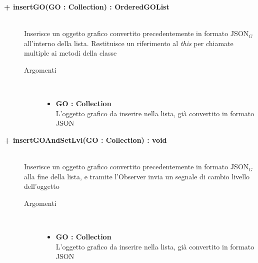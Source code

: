 \begin{description}
\begin{description}
	\end{description}
	
	\begin{description}
		\item[\textbf{\color{blue}+ insertGO(GO : Collection) : OrderedGOList			}] \hfill \\
			Inserisce un oggetto grafico convertito precedentemente in formato JSON$_G$ all'interno della lista. Restituisce un riferimento al \textit{this} per chiamate multiple ai metodi della classe
			
		\begin{description}
			\item[Argomenti] \hfill \\
				\begin{itemize}
				
					\item \textbf{GO : Collection			} \hfill \\
					L'oggetto grafico da inserire nella lista, già convertito in formato JSON
					
				\end{itemize}
		\end{description}
	\end{description}
	
	\begin{description}
		\item[\textbf{\color{blue}+ insertGOAndSetLvl(GO : Collection) : void			}] \hfill \\
			Inserisce un oggetto grafico convertito precedentemente in formato JSON$_G$ alla fine della lista, e tramite l'Observer invia un segnale di cambio livello dell'oggetto
			
		\begin{description}
			\item[Argomenti] \hfill \\
				\begin{itemize}
				
					\item \textbf{GO : Collection			} \hfill \\
					L'oggetto grafico da inserire nella lista, già convertito in formato JSON
					
				\end{itemize}
		\end{description}
	\end{description}
	

\end{description}
